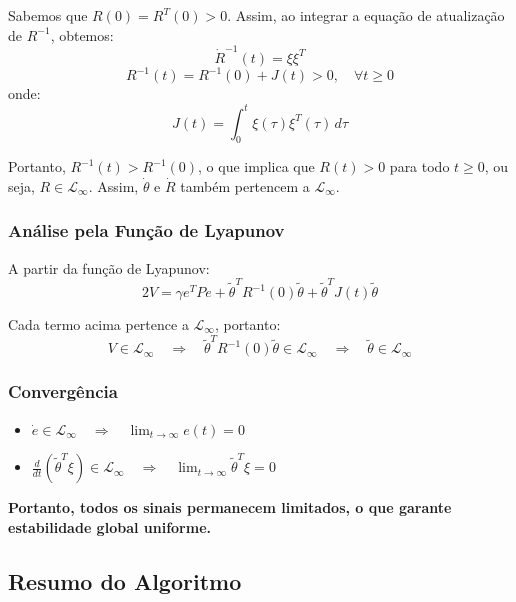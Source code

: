 \documentclass[10pt]{article}
\begin{document}
Sabemos que $R(0) = R^T(0) > 0$. Assim, ao integrar a equação de atualização de $R^{-1}$, obtemos:
\[
\dot{R}^{-1}(t) = \xi \xi^T
\]
\[
R^{-1}(t) = R^{-1}(0) + J(t) > 0, \quad \forall t \geq 0
\]
onde:
\[
J(t) = \int_0^t \xi(\tau)\xi^T(\tau)\,d\tau
\]

Portanto, $R^{-1}(t) > R^{-1}(0)$, o que implica que $R(t) > 0$ para todo $t \geq 0$, ou seja, $R \in \mathcal{L}_\infty$. Assim, $\dot{\theta}$ e $\dot{R}$ também pertencem a $\mathcal{L}_\infty$.

\subsubsection{Análise pela Função de Lyapunov}

A partir da função de Lyapunov:
\[
2V = \gamma e^T P e + \tilde{\theta}^T R^{-1}(0) \tilde{\theta} + \tilde{\theta}^T J(t) \tilde{\theta}
\]

Cada termo acima pertence a $\mathcal{L}_\infty$, portanto:
\[
V \in \mathcal{L}_\infty \quad \Rightarrow \quad \tilde{\theta}^T R^{-1}(0) \tilde{\theta} \in \mathcal{L}_\infty \quad \Rightarrow \quad \tilde{\theta} \in \mathcal{L}_\infty
\]

\subsubsection{Convergência}

\begin{itemize}
    \item $\dot{e} \in \mathcal{L}_\infty \quad \Rightarrow \quad \lim_{t \to \infty} e(t) = 0$
    \item $\frac{d}{dt} (\tilde{\theta}^T \xi) \in \mathcal{L}_\infty \quad \Rightarrow \quad \lim_{t \to \infty} \tilde{\theta}^T \xi = 0$
\end{itemize}

\textbf{Portanto, todos os sinais permanecem limitados, o que garante estabilidade global uniforme.}

\subsection{Resumo do Algoritmo}
\end{document}
